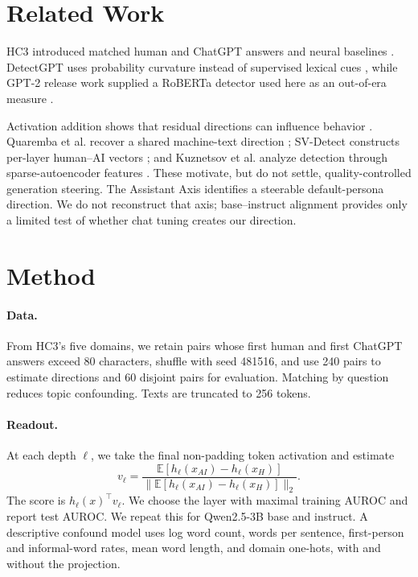 \documentclass[10pt,twocolumn]{article}
\newcommand{\model}{Qwen2.5-3B}
\begin{document}
\section{Related Work}
HC3 introduced matched human and ChatGPT answers and neural baselines \citep{guo2023hc3}. DetectGPT uses probability curvature instead of supervised lexical cues \citep{mitchell2023detectgpt}, while GPT-2 release work supplied a RoBERTa detector used here as an out-of-era measure \citep{solaiman2019release}.

Activation addition shows that residual directions can influence behavior \citep{turner2023steering,panickssery2023steering}. Quaremba et al. recover a shared machine-text direction \citep{quaremba2026linear}; SV-Detect constructs per-layer human--AI vectors \citep{svdetect2026}; and Kuznetsov et al. analyze detection through sparse-autoencoder features \citep{kuznetsov2025feature}. These motivate, but do not settle, quality-controlled generation steering. The Assistant Axis \citep{lu2026assistant} identifies a steerable default-persona direction. We do not reconstruct that axis; base--instruct alignment provides only a limited test of whether chat tuning creates our direction.

\section{Method}
\paragraph{Data.} From HC3's five domains, we retain pairs whose first human and first ChatGPT answers exceed 80 characters, shuffle with seed 481516, and use 240 pairs to estimate directions and 60 disjoint pairs for evaluation. Matching by question reduces topic confounding. Texts are truncated to 256 tokens.

\paragraph{Readout.} At each depth $\ell$, we take the final non-padding token activation and estimate
\begin{equation}
v_\ell=\frac{\mathbb{E}[h_\ell(x_{AI})-h_\ell(x_H)]}{\|\mathbb{E}[h_\ell(x_{AI})-h_\ell(x_H)]\|_2}.
\end{equation}
The score is $h_\ell(x)^\top v_\ell$. We choose the layer with maximal training AUROC and report test AUROC. We repeat this for \model{} base and instruct. A descriptive confound model uses log word count, words per sentence, first-person and informal-word rates, mean word length, and domain one-hots, with and without the projection.
\end{document}
